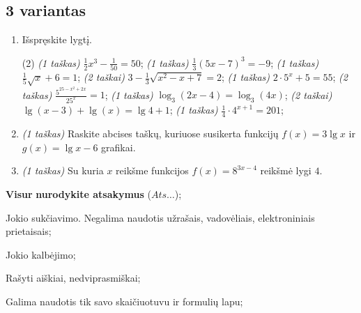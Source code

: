 \documentclass[a4paper]{article}
\begin{document}
\vspace*{12mm}

\subsection*{3 variantas}

\begin{enumerate}
      \item Išspręskite lygtį.
            \begin{tasks}[item-format={\normalfont}, after-item-skip=2mm](2)
                  \task \textit{(1 taškas)} $\frac{1}{2}x^3-\frac{1}{50}=50$;
                  \task \textit{(1 taškas)} $\frac{1}{3}(5x-7)^3=-9$;
                  \task \textit{(1 taškas)} $\frac{1}{5}\sqrt{x}+6=1$;
                  \task \textit{(2 taškai)} $3-\frac{1}{3}\sqrt{x^2-x+7}=2$;
                  \task \textit{(1 taškas)} $2\cdot5^x+5=55$;
                  \task \textit{(2 taškas)} $\frac{5^{25-x^2+2x}}{25^x}=1$;
                  \task \textit{(1 taškas)} $\log_3(2x-4)=\log_3(4x)$;
                  \task \textit{(2 taškai)} $\lg(x-3)+\lg(x)=\lg4+1$;
                  \task \textit{(1 taškas)} $\frac{1}{4}\cdot 4^{x+1}=201$;
            \end{tasks}
            
      \item \textit{(1 taškas)} Raskite abcises taškų, kuriuose susikerta funkcijų $f(x)=3\lg{x}$ ir $g(x)=\lg{x}-6$ grafikai.
      \item \textit{(1 taškas)} Su kuria $x$ reikšme funkcijos $f(x)=8^{3x-4}$ reikšmė lygi $4$.
\end{enumerate}

\begin{small}
      \begin{enumerate*}[label={(\arabic*)}]
            \item \textbf{Visur} \textbf{nurodykite atsakymus} ($Ats\ldots$);
            \item Jokio sukčiavimo. Negalima naudotis užrašais, vadovėliais,
            elektroniniais prietaisais;
            \item Jokio kalbėjimo;
            \item Rašyti aiškiai, nedviprasmiškai;
            \item Galima naudotis tik savo skaičiuotuvu ir formulių lapu;
      \end{enumerate*}
\end{small}
\end{document}
